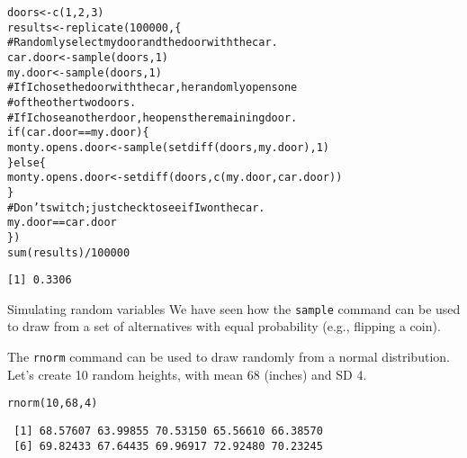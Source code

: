 \documentclass{beamer}\usepackage[]{graphicx}\usepackage[]{color}
\makeatletter
\newcommand{\hlnum}[1]{\textcolor[rgb]{0.824,0.412,0.118}{#1}}%
\newcommand{\hlcom}[1]{\textcolor[rgb]{0.824,0.706,0.549}{#1}}%
\newcommand{\hlopt}[1]{\textcolor[rgb]{1,0.894,0.769}{#1}}%
\newcommand{\hlstd}[1]{\textcolor[rgb]{1,0.894,0.769}{#1}}%
\newcommand{\hlkwa}[1]{\textcolor[rgb]{0.941,0.902,0.549}{#1}}%
\newcommand{\hlkwb}[1]{\textcolor[rgb]{0.804,0.776,0.451}{#1}}%
\newcommand{\hlkwd}[1]{\textcolor[rgb]{1,0.78,0.769}{#1}}%
\newenvironment{kframe}{%
 \def\at@end@of@kframe{}%
 \ifinner\ifhmode%
  \def\at@end@of@kframe{\end{minipage}}%
  \begin{minipage}{\columnwidth}%
 \fi\fi%
 \def\FrameCommand##1{\hskip\@totalleftmargin \hskip-\fboxsep
 \colorbox{shadecolor}{##1}\hskip-\fboxsep
     \hskip-\linewidth \hskip-\@totalleftmargin \hskip\columnwidth}%
 \MakeFramed {\advance\hsize-\width
   \@totalleftmargin\z@ \linewidth\hsize
   \@setminipage}}%
 {\par\unskip\endMakeFramed%
 \at@end@of@kframe}
\newenvironment{knitrout}{}{} %
\makeatother
\begin{document}
\begin{darkframes}
    \begin{frame}[fragile]
      \fontsize{10}{10}\selectfont
\begin{knitrout}
\begin{kframe}
\begin{alltt}
\hlstd{doors} \hlkwb{<-} \hlkwd{c}\hlstd{(}\hlnum{1}\hlstd{,} \hlnum{2}\hlstd{,} \hlnum{3}\hlstd{)}
\hlstd{results} \hlkwb{<-} \hlkwd{replicate}\hlstd{(}\hlnum{100000}\hlstd{, \{}
  \hlcom{# Randomly select my door and the door with the car.}
  \hlstd{car.door} \hlkwb{<-} \hlkwd{sample}\hlstd{(doors,} \hlnum{1}\hlstd{)}
  \hlstd{my.door} \hlkwb{<-} \hlkwd{sample}\hlstd{(doors,} \hlnum{1}\hlstd{)}
  \hlcom{# If I chose the door with the car, he randomly opens one}
  \hlcom{#   of the other two doors.}
  \hlcom{# If I chose another door, he opens the remaining door.}
  \hlkwa{if} \hlstd{(car.door} \hlopt{==} \hlstd{my.door) \{}
    \hlstd{monty.opens.door} \hlkwb{<-} \hlkwd{sample}\hlstd{(}\hlkwd{setdiff}\hlstd{(doors, my.door),} \hlnum{1}\hlstd{)}
  \hlstd{\}} \hlkwa{else} \hlstd{\{}
    \hlstd{monty.opens.door} \hlkwb{<-} \hlkwd{setdiff}\hlstd{(doors,} \hlkwd{c}\hlstd{(my.door, car.door))}
  \hlstd{\}}
  \hlcom{# Don't switch; just check to see if I won the car.}
  \hlstd{my.door} \hlopt{==} \hlstd{car.door}
\hlstd{\})}
\hlkwd{sum}\hlstd{(results)} \hlopt{/} \hlnum{100000}
\end{alltt}
\begin{verbatim}
[1] 0.3306
\end{verbatim}
\end{kframe}
\end{knitrout}
    \end{frame}

    \begin{frame}[fragile]{Simulating random variables}
      We have seen how the \texttt{sample} command can be used to draw from a set of alternatives with equal probability (e.g., flipping a coin).

      The \texttt{rnorm} command can be used to draw randomly from a normal distribution. Let's create 10 random heights, with mean 68 (inches) and SD 4.

\begin{knitrout}
\begin{kframe}
\begin{alltt}
\hlkwd{rnorm}\hlstd{(}\hlnum{10}\hlstd{,} \hlnum{68}\hlstd{,} \hlnum{4}\hlstd{)}
\end{alltt}
\begin{verbatim}
 [1] 68.57607 63.99855 70.53150 65.56610 66.38570
 [6] 69.82433 67.64435 69.96917 72.92480 70.23245
\end{verbatim}
\end{kframe}
\end{knitrout}
      \lc
    \end{frame}


\end{darkframes}
\end{document}
